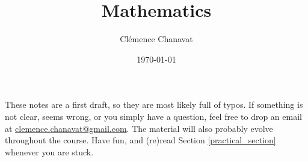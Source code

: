 \documentclass[10pt]{article}
\title{ Mathematics }
\author{ Clémence Chanavat}
\date{\today}
\begin{document}
\maketitle

\tableofcontents
\vspace{3em}


These notes are a first draft, so they are most likely full of typos. If something is not clear, seems wrong, or you simply have a question, feel free to drop an email at \href{mailto:clemence.chanavat@gmail.com}{clemence.chanavat@gmail.com}. The material will also probably evolve throughout the course. Have fun, and (re)read Section \ref{practical_section} whenever you are stuck.

% 
\pagebreak

\pagebreak

\pagebreak




% 
% 
\end{document}

